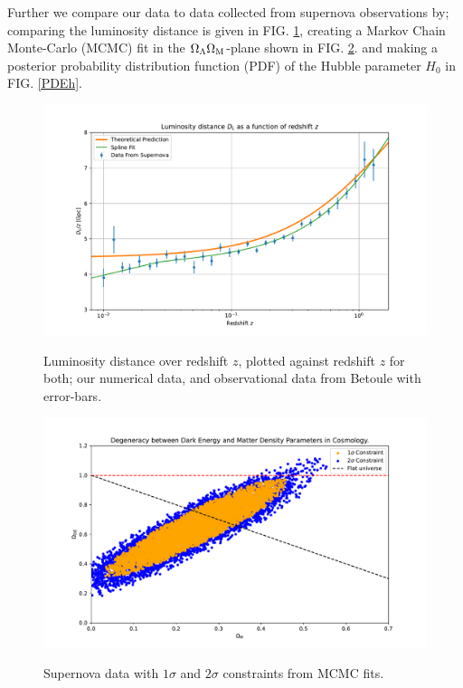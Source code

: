\documentclass[%
reprint,
 amsmath,amssymb,
 aps,
]{revtex4-2}
\begin{document}
Further we compare our data to data collected from supernova observations \cite[Betoule et al. 2014]{SDSS:2014iwm} by; comparing the luminosity distance is given in FIG. \ref{LumiDistance}, creating a Markov Chain Monte-Carlo (MCMC) fit in the $\Omega_\Lambda\Omega_\text M$-plane shown in FIG. \ref{scatt}. and making a posterior probability distribution function (PDF) of the Hubble parameter $H_0$ in FIG. \ref{PDEh}.
\begin{figure}[H]
	\caption{Luminosity distance over redshift $z$, plotted against redshift $z$ for both; our numerical data, and observational data from Betoule \cite{SDSS:2014iwm} with error-bars.}
	\includegraphics[width = \linewidth]{Figures/LumiDistance.pdf}
	\label{LumiDistance}
\end{figure}
\begin{figure}
	\caption{Supernova data with $1\sigma$ and $2\sigma$ constraints from MCMC fits.}
	\includegraphics[width = \linewidth]{Figures/ScattPlot.pdf}
	\label{scatt}
\end{figure}
\end{document}
